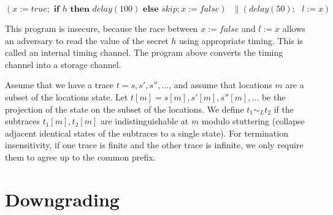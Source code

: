 \documentclass{article}
\begin{document}
\[ (x := true; \textbf{ if } h \textbf{ then } delay(100) \textbf{ else } skip; x := false)\text{ } \parallel (delay(50); \text{ } l := x)\]

This program is insecure, because the race between $x := false$ and $l := x$ allows an adversary to read the value of the secret $h$ using appropriate timing. This is called an internal timing channel. The program above converts the timing channel into a storage channel.

Assume that we have a trace $t = s,s',s'',\dots$, and assume that locations $m$ are a subset of the locations state. Let $t[m] = s[m],s'[m],s''[m],\dots$ be the projection of the state on the subset of the locations. We define $t_1 \sim_L t_2$ if the subtraces $t_1[m],t_2[m]$ are indistinguishable at $m$ modulo stuttering (collapse adjacent identical states of the subtraces to a single state). For termination insensitivity, if one trace is finite and the other trace is infinite, we only require them to agree up to the common prefix. 

\section*{Downgrading}
\end{document}
